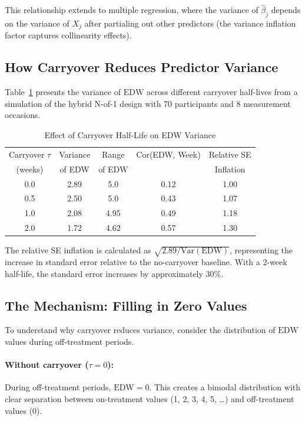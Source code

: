 \documentclass[11pt,letterpaper]{article}
\begin{document}
This relationship extends to multiple regression, where the variance of
$\hat{\beta}_j$ depends on the variance of $X_j$ after partialing out other
predictors (the variance inflation factor captures collinearity effects).

\subsection{How Carryover Reduces Predictor Variance}

Table~\ref{tab:variance} presents the variance of $\text{EDW}$ across
different carryover half-lives from a simulation of the hybrid N-of-1 design
with 70 participants and 8 measurement occasions.

\begin{table}[htbp]
\centering
\caption{Effect of Carryover Half-Life on EDW Variance}
\label{tab:variance}
\begin{tabular}{@{}ccccc@{}}
\toprule
Carryover $\tau$ & Variance & Range & Cor(EDW, Week) & Relative SE \\
(weeks) & of EDW & of EDW & & Inflation \\
\midrule
0.0 & 2.89 & 5.0 & 0.12 & 1.00 \\
0.5 & 2.50 & 5.0 & 0.43 & 1.07 \\
1.0 & 2.08 & 4.95 & 0.49 & 1.18 \\
2.0 & 1.72 & 4.62 & 0.57 & 1.30 \\
\bottomrule
\end{tabular}
\end{table}

The relative SE inflation is calculated as $\sqrt{2.89/\text{Var}(\text{EDW})}$,
representing the increase in standard error relative to the no-carryover
baseline. With a 2-week half-life, the standard error increases by
approximately 30\%.

\subsection{The Mechanism: Filling in Zero Values}

To understand why carryover reduces variance, consider the distribution of
$\text{EDW}$ values during off-treatment periods.

\paragraph{Without carryover ($\tau = 0$):}
During off-treatment periods, $\text{EDW} = 0$. This creates a bimodal
distribution with clear separation between on-treatment values
(1, 2, 3, 4, 5, \ldots) and off-treatment values (0).
\end{document}
